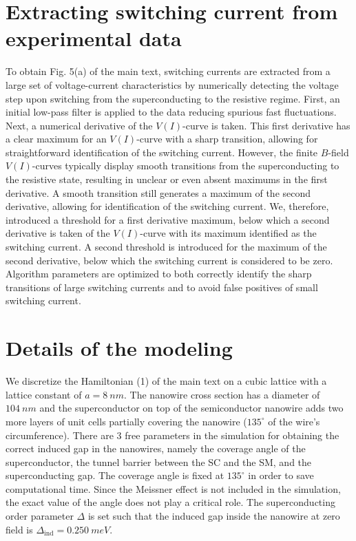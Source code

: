 \documentclass[english, aps,prb,showpacs,preprintnumber,amsmath,amssymb,superscriptaddress,reprint]{revtex4-1}
\begin{document}
\section{Extracting switching current from experimental data}

To obtain Fig. 5(a) of the main text, switching currents are extracted from a large set of voltage-current characteristics by numerically detecting the voltage step upon switching from the superconducting to the resistive regime. 
First, an initial low-pass filter is applied to the data reducing spurious fast fluctuations.
Next, a numerical derivative of the $V\left(I\right)$-curve is taken. 
This first derivative has a clear maximum for an $V\left(I\right)$-curve with a sharp transition, allowing for straightforward identification of the switching current.
However, the finite $B$-field $V\left(I\right)$-curves typically display smooth transitions from the superconducting to the resistive state, resulting in unclear or even absent maximums in the first derivative. 
A smooth transition still generates a maximum of the second derivative, allowing for identification of the switching current. 
We, therefore, introduced a threshold for a first derivative maximum, below which a second derivative is taken of the $V\left(I\right)$-curve with its maximum identified as the switching current.
A second threshold is introduced for the maximum of the second derivative, below which the switching current is considered to be zero. 
Algorithm parameters are optimized to both correctly identify the sharp transitions of large switching currents and to avoid false positives of small switching current. 


\section{Details of the modeling}

We discretize the Hamiltonian (1) of the main text on a cubic lattice with a lattice constant of $a=\SI{8}{nm}$.
The nanowire cross section has a diameter of $\SI{104}{nm}$ and the superconductor on top of the semiconductor nanowire adds two more layers of unit cells partially covering the nanowire ($135^{\circ}$ of the wire's circumference). There are 3 free parameters in the simulation for obtaining the correct induced gap in the nanowires, namely the coverage angle of the superconductor, the tunnel barrier between the SC and the SM, and the superconducting gap. The coverage angle is fixed at $135^{\circ}$ in order to save computational time. Since the Meissner effect is not included in the simulation, the exact value of the angle does not play a critical role. The superconducting order parameter $\Delta$ is set such that the induced gap inside the nanowire at zero field is $\Delta_\textrm{ind} = \SI{0.250}{meV}$.
\end{document}
